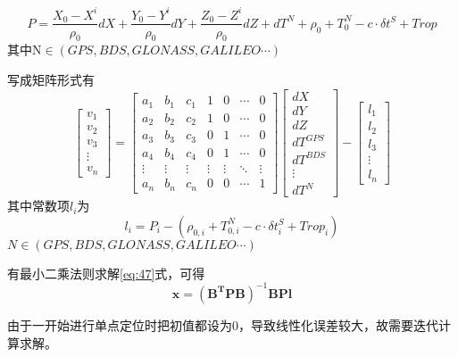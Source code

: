 \documentclass{ctexart}
\begin{document}
\begin{equation}
P=\frac{X_0-X^i}{\rho_0}dX+\frac{Y_0-Y^i}{\rho_0}dY+\frac{Z_0-Z^i}{\rho_0}dZ+dT^N+\rho_0+T^N_0 - c\cdot\delta t^S+Trop
\label{eq:48}
\end{equation}
其中N$\in(GPS,BDS,GLONASS,GALILEO\cdots)$

写成矩阵形式有
\begin{equation}
\begin{bmatrix}
v_1\\
v_2\\
v_3\\
\vdots\\
v_n
\end{bmatrix}=\begin{bmatrix}
a_1&b_1&c_1&1&0&\cdots&0\\
a_2&b_2&c_2&1&0&\cdots&0\\
a_3&b_3&c_3&0&1&\cdots&0\\
a_4&b_4&c_4&0&1&\cdots&0\\
\vdots&\vdots&\vdots&\vdots&\vdots&\ddots&\vdots\\
a_n&b_n&c_n&0&0&\cdots&1
\end{bmatrix}\begin{bmatrix}
dX\\
dY\\
dZ\\
dT^{GPS}\\
dT^{BDS}\\
\vdots\\
dT^{N}
\end{bmatrix}-\begin{bmatrix}
l_1\\
l_2\\
l_3\\
\vdots\\
l_n
\end{bmatrix}
\label{eq:49}
\end{equation}
其中常数项$l_i$为
\begin{equation}
l_i=P_i-(\rho_{0,i}+T^N_{0,i}-c\cdot\delta t^S_i+Trop_i)
\end{equation}
$N\in(GPS,BDS,GLONASS,GALILEO\cdots)$

有最小二乘法则求解\eqref{eq:47}式，可得
\begin{equation}
\mathbf{x}=(\mathbf{B^T}\mathbf{P}\mathbf{B})^{-1}\mathbf{B}\mathbf{P}\mathbf{l}
\end{equation}

由于一开始进行单点定位时把初值都设为0，导致线性化误差较大，故需要迭代计算求解。
\end{document}
